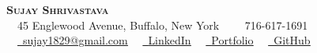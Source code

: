 \begin{center}
    \textbf{\Huge \scshape {} \selectfont Sujay Shrivastava} \\ \vspace{2pt}
    \small
    \ \faHome \ 45 Englewood Avenue, Buffalo, New York \ \textbar\ 
    \ \faPhone \ 716-617-1691 \ \textbar\ 
    \href{mailto:sujay1829@gmail.com}{\faEnvelope \ \underline{sujay1829@gmail.com}} \ \textbar\ 
    \href{https://www.linkedin.com/in/sujayshrivastava/}{\faLinkedin \ \underline{LinkedIn}} \ \textbar\ 
    \href{https://jayshrivastava0.github.io/portfolio/}{\faGlobe \ \underline{Portfolio}} \ \textbar\ 
    \href{https://github.com/jayshrivastava0/}{\faGithub \ \underline{GitHub}}
\end{center}

